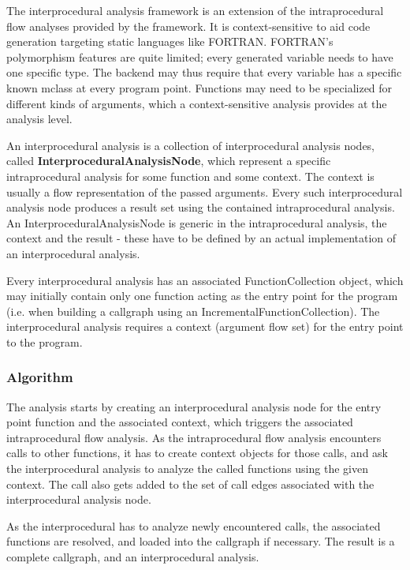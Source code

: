 The interprocedural analysis framework is an extension of the
intraprocedural flow analyses provided by the \mcsaf framework. It is
context-sensitive to aid code generation targeting static languages
like {\sc FORTRAN}. {\sc FORTRAN}'s polymorphism features are quite
limited; every generated variable needs to have one specific type. The
backend may thus require that every \matlab variable has a specific
known mclass at every program point. Functions may need to be
specialized for different kinds of arguments, which a
context-sensitive analysis provides at the analysis level.

An interprocedural analysis is a collection of interprocedural
analysis nodes, called \textbf{InterproceduralAnalysisNode}, which represent
a specific intraprocedural analysis for some function and some
context.
The context is usually a flow representation of the passed
arguments. Every such interprocedural analysis node produces a result
set using the contained intraprocedural analysis.
An InterproceduralAnalysisNode is generic in the intraprocedural analysis,
the context and the result - these have to be defined by an 
actual implementation of an interprocedural analysis.

Every interprocedural analysis has an associated FunctionCollection
object, which may initially contain only one function acting as the
entry point for the program (i.e. when building a callgraph using an
IncrementalFunctionCollection). The interprocedural analysis requires
a context (argument flow set) for the entry point to the program.

\subsubsection{Algorithm}

The analysis starts by creating an interprocedural analysis node
for the entry point function and the associated context, which
triggers the associated intraprocedural flow analysis. As the
intraprocedural flow analysis encounters calls to other functions, it
has to create context objects for those calls, and ask the
interprocedural analysis to analyze the called functions using the
given context. The call also gets added to the set of call edges
associated with the interprocedural analysis node.

As the interprocedural has to analyze newly encountered calls, the
associated functions are resolved, and loaded into the callgraph if
necessary. The result is a complete callgraph, and an interprocedural
analysis.


